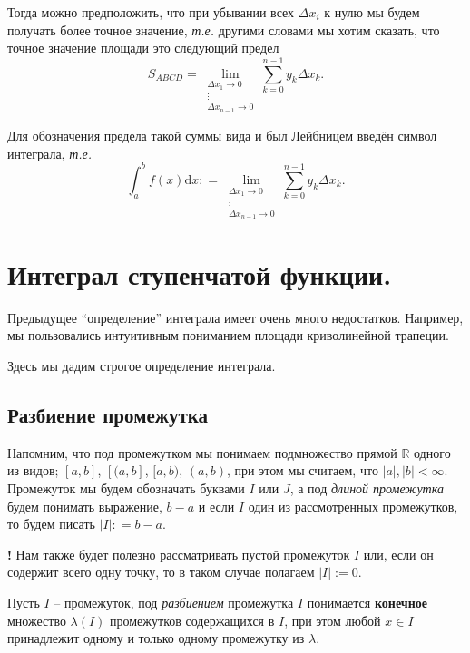 Тогда можно предположить, что при убывании всех $\Delta x_i$ к нулю мы будем получать более точное значение, \textit{т.е.} другими словами мы хотим сказать, что точное значение площади это следующий предел
\[
 S_{ABCD} = \lim_{\substack{\Delta x_1 \to 0 \\ \vdots \\ \Delta x_{n-1} \to 0}} \sum_{k = 0}^{n-1} y_k \Delta x_k.
\]

Для обозначения предела такой суммы вида и был Лейбницем введён символ интеграла, \textit{т.е.}
\[
 \int_a^b f(x) \mathrm{d}x : = \lim_{\substack{\Delta x_1 \to 0 \\ \vdots \\ \Delta x_{n-1} \to 0}} \sum_{k = 0}^{n-1} y_k \Delta x_k.
\]


\section{Интеграл ступенчатой функции.}

Предыдущее ``определение'' интеграла имеет очень много недостатков. Например, мы пользовались интуитивным пониманием площади криволинейной трапеции. 

Здесь мы дадим строгое определение интеграла.

\subsection{Разбиение промежутка} Напомним, что под промежутком мы понимаем подмножество прямой $\mathbb{R}$ одного из видов; $[a,b]$, $[(a,b]$, $[a,b)$, $(a,b)$, при этом мы считаем, что $|a|,|b| < \infty.$ Промежуток мы будем обозначать буквами $I$ или $J$, а под \textit{длиной промежутка} будем понимать выражение, $b-a$ и если $I$ один из рассмотренных промежутков, то будем писать $|I|: = b-a.$

\begin{mydanger}{\bf !}
    Нам также будет полезно рассматривать пустой промежуток $I$ или, если он содержит всего одну точку, то в таком случае полагаем $|I|:=0$.
\end{mydanger}

\begin{definition}
    Пусть $I$ -- промежуток, под \textit{разбиением} промежутка $I$ понимается \textbf{конечное} множество $\lambda(I)$ промежутков содержащихся в $I$, при этом любой $x \in I$ принадлежит одному и только одному промежутку из $\lambda.$
\end{definition}

